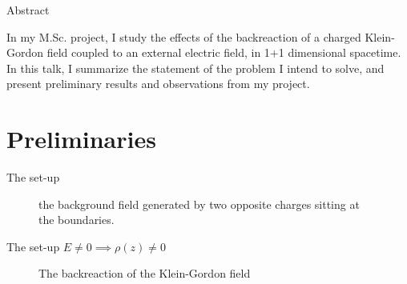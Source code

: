 \begin{frame}{Abstract}

	In my M.Sc. project, I study the effects of the backreaction of a charged Klein-Gordon
field coupled to an external electric field, in 1+1 dimensional spacetime.
In this talk, I summarize the statement of the problem I intend to solve, and present preliminary results and observations from my project. 
\end{frame}

\section{Preliminaries}
\begin{frame}{The set-up}
		    \begin{figure}[ht]
		        \centering
		        \caption{the background field generated by two opposite charges sitting at the boundaries.}
		        \label{fig:the-background-field-generated-by-two-opposite-charges-sitting-at-the-boundaries.}
		    \end{figure}
\end{frame}


\begin{frame}{The set-up}
	\vspace{1cm}
	\centering
	\hspace{-2cm}$E\neq0 \implies \rho(z) \neq 0$
	\vspace{-1cm}
\begin{figure}[ht]
    \centering
    \caption{The backreaction of the Klein-Gordon field}
    \label{fig:the-backreaction-of-the-klein-gordon-field}
\end{figure}
\end{frame}

